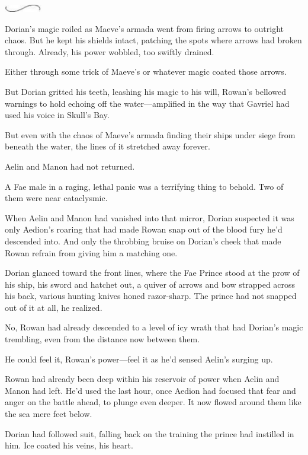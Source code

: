 \begin{center}
	\includegraphics[width=0.65in,height=0.13in]{images/seperator}
\end{center}

Dorian's magic roiled as Maeve's armada went from firing arrows to outright chaos.
But he kept his shields intact, patching the spots where arrows had broken through.
Already, his power wobbled, too swiftly drained.

Either through some trick of Maeve's or whatever magic coated those arrows.

But Dorian gritted his teeth, leashing his magic to his will, Rowan's bellowed warnings to hold echoing off the water---amplified in the way that Gavriel had used his voice in Skull's Bay.

But even with the chaos of Maeve's armada finding their ships under siege from beneath the water, the lines of it stretched away forever.

Aelin and Manon had not returned.

A Fae male in a raging, lethal panic was a terrifying thing to behold.
Two of them were near cataclysmic.

When Aelin and Manon had vanished into that mirror, Dorian suspected it was only Aedion's roaring that had made Rowan snap out of the blood fury he'd descended into.
And only the throbbing bruise on Dorian's cheek that made Rowan refrain from giving him a matching one.

Dorian glanced toward the front lines, where the Fae Prince stood at the prow of his ship, his sword and hatchet out, a quiver of arrows and bow strapped across his back, various hunting knives honed razor-sharp.
The prince had not snapped out of it at all, he realized.

No, Rowan had already descended to a level of icy wrath that had Dorian's magic trembling, even from the distance now between them.

He could feel it, Rowan's power---feel it as he'd sensed Aelin's surging up.

Rowan had already been deep within his reservoir of power when Aelin and Manon had left.
He'd used the last hour, once Aedion had focused that fear and anger on the battle ahead, to plunge even deeper.
It now flowed around them like the sea mere feet below.

Dorian had followed suit, falling back on the training the prince had instilled in him.
Ice coated his veins, his heart.

